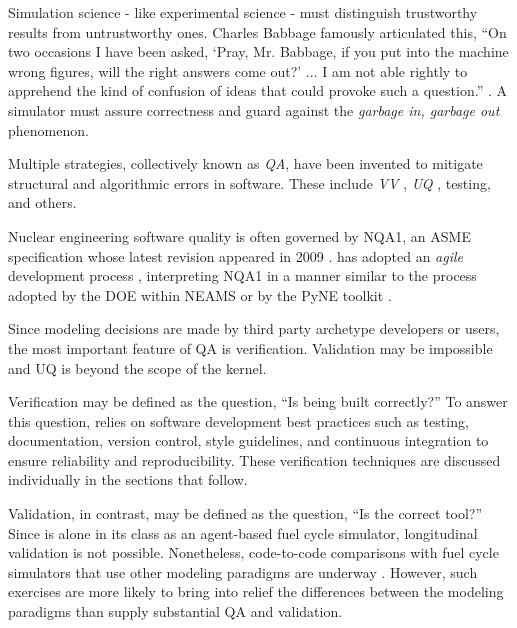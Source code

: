 
Simulation science - like experimental science - must distinguish trustworthy
results from untrustworthy ones.
Charles Babbage famously articulated this, ``On two occasions I have been asked,
`Pray, Mr. Babbage, if you put into the machine wrong figures, will the right
answers come out?' ... I am not able rightly to apprehend the kind of confusion
of ideas that could provoke such a question.'' \cite{babbage_passages_2011}.
A simulator must assure correctness and guard against the \emph{garbage
in, garbage out} phenomenon.

Multiple strategies, collectively known as \emph{\gls{QA}}, have
been invented to mitigate structural and algorithmic errors
in software. These include \emph{\gls{VV}}
\cite{boehm_software_1989}, \emph{\gls{UQ}}
\cite{sacks_design_1989}, testing, and others.

Nuclear engineering software quality is often governed by \gls{NQA1}, an
\gls{ASME} specification
whose latest revision appeared in 2009 \cite{asme_nqa-1a-2009_2009}.
\Cyclus has adopted an \emph{agile} development process
\cite{larman_agile_2004},
interpreting \gls{NQA1} in a manner similar to the process adopted by the
\gls{DOE} within \gls{NEAMS} \cite{neams_nuclear_2013} or by the PyNE toolkit
\cite{biondo_quality_2014}.

Since \Cyclus modeling decisions are made
by third party archetype developers or users, the most important feature of
\gls{QA} is verification. Validation may be impossible and \gls{UQ} is beyond
the scope of the kernel.

Verification may be defined as the question, ``Is \Cyclus being built correctly?''
To answer this question, \Cyclus relies on software development best practices
such as testing,
documentation, version control, style guidelines, and continuous integration to
ensure reliability and reproducibility. These verification techniques are
discussed individually in the sections that follow.

Validation, in contrast,  may be defined as the question,
``Is \Cyclus the correct tool?''
Since \Cyclus is alone in its class as an agent-based fuel cycle simulator, longitudinal
validation is not possible. Nonetheless, code-to-code comparisons with fuel cycle
simulators that use other modeling paradigms are underway
\cite{huff_extensions_2014}. However, such
exercises are more likely to bring into relief the differences between the modeling
paradigms than supply substantial \gls{QA} and validation.


